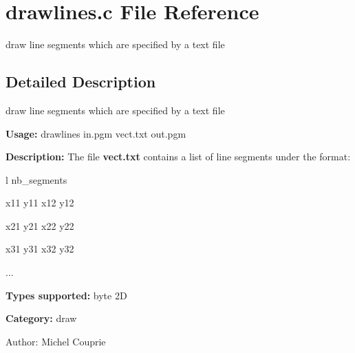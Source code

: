 \section{drawlines.c File Reference}
\label{drawlines_8c}
draw line segments which are specified by a text file 



\subsection{Detailed Description}
draw line segments which are specified by a text file 

{\bf Usage:} drawlines in.pgm vect.txt out.pgm

{\bf Description:} The file {\bf vect.txt} contains a list of line segments under the format:\par
 l nb\_\-segments\par
 x11 y11 x12 y12\par
 x21 y21 x22 y22\par
 x31 y31 x32 y32\par
 ...\par


{\bf Types supported:} byte 2D

{\bf Category:} draw

\begin{Desc}
\item[Author:]Michel Couprie \end{Desc}
